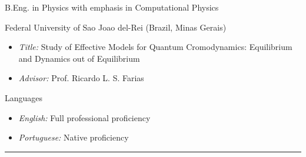 \documentclass[a4paper,10pt]{article}
\newlength{\cvcolumngapwidth}
\newlength{\cvleftcolumnwidth}
\newlength{\cvrightcolumnwidth}
\newcommand{\cvsectionstyle}[1]{{\normalsize\cvsectionfont\textcolor{cvsectioncolor}{#1}}}
\newcommand{\cvtitlestyle}[1]{{\normalsize\cvtitlefont\textcolor{cvtitlecolor}{#1}}}
\newcommand{\cvdurationstyle}[1]{{\normalsize\cvdurationfont\textcolor{cvdurationcolor}{#1}}}
\newlength{\cvafteritemskipamount}
\newlength{\cvaftersectionskipamount}
\newlength{\cvaftertitleskipamount}
\newlength{\cvparskip}
\newcommand{\cvsection}[1]{
    \begin{minipage}[t]{\cvleftcolumnwidth}
        \raggedleft\cvsectionstyle{#1}
    \end{minipage}%
    \hspace{\cvcolumngapwidth}%
    \begin{minipage}[t]{\cvrightcolumnwidth}
        \textcolor{cvrulecolor}{\rule{\cvrightcolumnwidth}{0.5mm}}
    \end{minipage}
    \vspace{\cvaftersectionskipamount}}
\newcommand{\cvitem}[2]{
    \begin{minipage}[t]{\cvleftcolumnwidth}
        \raggedleft #1
    \end{minipage}%
    \hspace{\cvcolumngapwidth}%
    \begin{minipage}[t]{\cvrightcolumnwidth}
        \setlength{\parskip}{\cvparskip} #2
    \end{minipage}
    \vspace{\cvafteritemskipamount}}
\newcommand{\cvtitle}[1]{
    \cvtitlestyle{#1}
    \vspace{\cvaftertitleskipamount}
    \vspace{-\cvparskip}}
\begin{document}
\cvitem{\cvdurationstyle{2010 - 2013}}
    {\cvtitle{B.Eng. in Physics with emphasis in Computational Physics }

    Federal University of Sao Joao del-Rei (Brazil, Minas Gerais)
    
    \begin{itemize}[leftmargin=*]
        \item \textit{Title:} Study of Effective Models for Quantum Cromodynamics: Equilibrium and Dynamics out of Equilibrium
        
    \item \textit{Advisor:} Prof. Ricardo L. S. Farias
    
    \end{itemize}}

\cvitem{\cvdurationstyle{}}
    {\cvtitle{Languages}
    
    \begin{itemize}[leftmargin=*]
        \item \textit{English:} Full professional proficiency
        
        \item \textit{Portuguese:} Native proficiency
        
        \end{itemize}}

\cvsection{Professional Experience}
\end{document}
